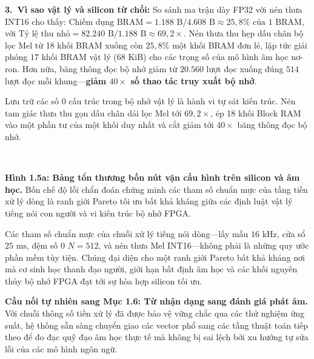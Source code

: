 \documentclass[11pt,a4paper]{article}
\begin{document}
\textbf{3.~Vì sao vật lý và silicon từ chối:} So sánh ma trận dày FP32 với nén thưa INT16 cho thấy: $\text{Chiếm dụng BRAM} = 1{.}188\text{ B} / 4{.}608\text{ B} \approx 25{,}8\% \text{ của 1 BRAM}$, với $\text{Tỷ lệ thu nhỏ} = 82{.}240\text{ B} / 1{.}188\text{ B} \approx 69{,}2\times$. Nén thưa thu hẹp dấu chân bộ lọc Mel từ 18 khối BRAM xuống còn $25{,}8\%$ một khối BRAM đơn lẻ, lập tức giải phóng $17$ khối BRAM vật lý ($68\text{ KiB}$) cho các trọng số của mô hình âm học nơ-ron. Hơn nữa, băng thông đọc bộ nhớ giảm từ $20{.}560$ lượt đọc xuống đúng $514$ lượt đọc mỗi khung---\textbf{giảm $40\times$ số thao tác truy xuất bộ nhớ}.

\begin{physicalinsight}
Lưu trữ các số 0 cấu trúc trong bộ nhớ vật lý là hành vi tự sát kiến trúc. Nén tam giác thưa thu gọn dấu chân dải lọc Mel tới $69{,}2\times$, ép 18 khối Block RAM vào một phần tư của một khối duy nhất và cắt giảm tới $40\times$ băng thông đọc bộ nhớ.
\end{physicalinsight}

\noindent\begin{minipage}{\textwidth}
\centering
\resizebox{0.92\textwidth}{!}{}\\[2pt]
{\small\textbf{Hình 1.5a: Bảng tổn thương bốn nút vặn cấu hình trên silicon và âm học.} Bốn chế độ lỗi chẩn đoán chứng minh các tham số chuẩn mực của tầng tiền xử lý dòng là ranh giới Pareto tối ưu bất khả kháng giữa các định luật vật lý tiếng nói con người và vi kiến trúc bộ nhớ FPGA.\par}
\end{minipage}

\begin{groundbreaking}
Các tham số chuẩn mực của chuỗi xử lý tiếng nói dòng---lấy mẫu $16\text{ kHz}$, cửa sổ $25\text{ ms}$, đệm số 0 $N=512$, và nén thưa Mel INT16---không phải là những quy ước phần mềm tùy tiện. Chúng đại diện cho một ranh giới Pareto bất khả kháng nơi mà cơ sinh học thanh đạo người, giới hạn bất định âm học và các khối nguyên thủy bộ nhớ FPGA đạt tới sự hòa hợp silicon tối ưu.
\end{groundbreaking}

\textbf{Cầu nối tự nhiên sang Mục 1.6: Từ nhận dạng sang đánh giá phát âm.} Với chuỗi thông số tiền xử lý đã được bảo vệ vững chắc qua các thử nghiệm ứng suất, hệ thống sẵn sàng chuyển giao các vector phổ sang các tầng thuật toán tiếp theo để đo đạc quỹ đạo âm học thực tế mà không bị sai lệch bởi xu hướng tự sửa lỗi của các mô hình ngôn ngữ.
\end{document}

